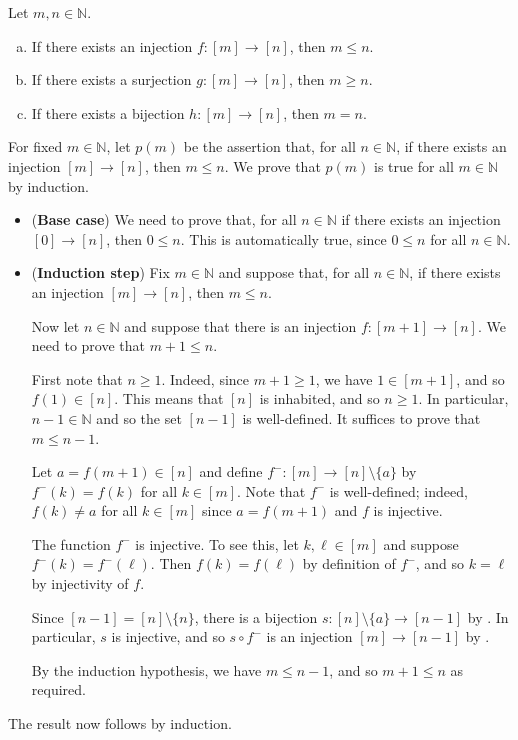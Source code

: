 \begin{theorem}
\label{thmJectionsAndSizeOfNaturalNumbers}
Let $m,n \in \mathbb{N}$.
\begin{enumerate}[(a)]
\item If there exists an injection $f : [m] \to [n]$, then $m \le n$.
\item If there exists a surjection $g : [m] \to [n]$, then $m \ge n$.
\item If there exists a bijection $h : [m] \to [n]$, then $m=n$.
\end{enumerate}
\end{theorem}

\begin{cproof}[of (a)]
For fixed $m \in \mathbb{N}$, let $p(m)$ be the assertion that, for all $n \in \mathbb{N}$, if there exists an injection $[m] \to [n]$, then $m \le n$. We prove that $p(m)$ is true for all $m \in \mathbb{N}$ by induction.

\begin{itemize}
\item (\textbf{Base case}) We need to prove that, for all $n \in \mathbb{N}$ if there exists an injection $[0] \to [n]$, then $0 \le n$. This is automatically true, since $0 \le n$ for all $n \in \mathbb{N}$.
\item (\textbf{Induction step}) Fix $m \in \mathbb{N}$ and suppose that, for all $n \in \mathbb{N}$, if there exists an injection $[m] \to [n]$, then $m \le n$.

Now let $n \in \mathbb{N}$ and suppose that there is an injection $f : [m+1] \to [n]$. We need to prove that $m+1 \le n$.

First note that $n \ge 1$. Indeed, since $m+1 \ge 1$, we have $1 \in [m+1]$, and so $f(1) \in [n]$. This means that $[n]$ is inhabited, and so $n \ge 1$. In particular, $n-1 \in \mathbb{N}$ and so the set $[n-1]$ is well-defined. It suffices to prove that $m \le n-1$.

Let $a = f(m+1) \in [n]$ and define $f^- : [m] \to [n] \setminus \{ a \}$ by $f^-(k) = f(k)$ for all $k \in [m]$. Note that $f^-$ is well-defined; indeed, $f(k) \ne a$ for all $k \in [m]$ since $a = f(m+1)$ and $f$ is injective.

The function $f^-$ is injective. To see this, let $k, \ell \in [m]$ and suppose $f^-(k) = f^-(\ell)$. Then $f(k) = f(\ell)$ by definition of $f^-$, and so $k = \ell$ by injectivity of $f$.

Since $[n-1] = [n] \setminus \{ n \}$, there is a bijection $s : [n] \setminus \{ a \} \to [n-1]$ by . In particular, $s$ is injective, and so $s \circ f^-$ is an injection $[m] \to [n-1]$ by .

By the induction hypothesis, we have $m \le n-1$, and so $m+1 \le n$ as required.
\end{itemize}
The result now follows by induction.
\end{cproof}

